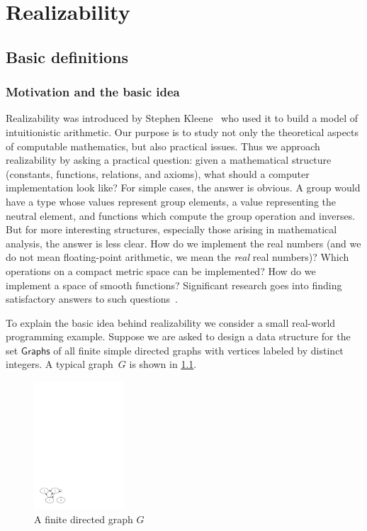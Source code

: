\chapter{Realizability}
\label{chap:realizability}

\section{Basic definitions}
\label{sec:basic-definitions}

\subsection{Motivation and the basic idea}
\label{sec:realizability-basic-idea}

Realizability was introduced by Stephen Kleene~
who used it to build a model of intuitionistic arithmetic. Our purpose
is to study not only the theoretical aspects of computable
mathematics, but also practical issues. Thus we approach realizability
by asking a practical question: given a mathematical structure
(constants, functions, relations, and axioms), what should a computer
implementation look like? For simple cases, the answer is obvious. A
group would have a type whose values represent group elements, a value
representing the neutral element, and functions which compute the
group operation and inverses. But for more interesting structures,
especially those arising in mathematical analysis, the answer is less
clear. How do we implement the real numbers (and we do not mean
floating-point arithmetic, we mean the \emph{real} real numbers)?
Which operations on a compact metric space can be implemented? How do
we implement a space of smooth functions? Significant research goes
into finding satisfactory answers to such
questions~.

To explain the basic idea behind realizability we consider a small
real-world programming example. Suppose we are asked to design a data
structure for the set $\mathsf{Graphs}$ of all finite
simple directed graphs with vertices labeled by distinct
integers. A typical graph~$G$ is shown in \cref{fig:digraph}.

\begin{figure}[htp]
  \centering
  \includegraphics[width=0.3\textwidth]{digraph}
  \caption{A finite directed graph $G$}
  \label{fig:digraph}
\end{figure}

